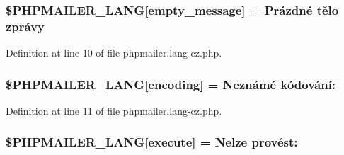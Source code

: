 \subsubsection[{\texorpdfstring{\$\+P\+H\+P\+M\+A\+I\+L\+E\+R\+\_\+\+L\+A\+NG}{$PHPMAILER_LANG}}]{\setlength{\rightskip}{0pt plus 5cm}\$P\+H\+P\+M\+A\+I\+L\+E\+R\+\_\+\+L\+A\+NG\mbox{[}\textquotesingle{}empty\+\_\+message\textquotesingle{}\mbox{]} = \textquotesingle{}Prázdné tělo zprávy\textquotesingle{}}\hypertarget{phpmailer_8lang-cz_8php_a33772099f637c9d6c2cd7425e0e37fed}{}\label{phpmailer_8lang-cz_8php_a33772099f637c9d6c2cd7425e0e37fed}


Definition at line 10 of file phpmailer.\+lang-\/cz.\+php.

\subsubsection[{\texorpdfstring{\$\+P\+H\+P\+M\+A\+I\+L\+E\+R\+\_\+\+L\+A\+NG}{$PHPMAILER_LANG}}]{\setlength{\rightskip}{0pt plus 5cm}\$P\+H\+P\+M\+A\+I\+L\+E\+R\+\_\+\+L\+A\+NG\mbox{[}\textquotesingle{}encoding\textquotesingle{}\mbox{]} = \textquotesingle{}Neznámé kódování\+: \textquotesingle{}}\hypertarget{phpmailer_8lang-cz_8php_a817f7283f3d54c970a0c10305cc668cc}{}\label{phpmailer_8lang-cz_8php_a817f7283f3d54c970a0c10305cc668cc}


Definition at line 11 of file phpmailer.\+lang-\/cz.\+php.

\subsubsection[{\texorpdfstring{\$\+P\+H\+P\+M\+A\+I\+L\+E\+R\+\_\+\+L\+A\+NG}{$PHPMAILER_LANG}}]{\setlength{\rightskip}{0pt plus 5cm}\$P\+H\+P\+M\+A\+I\+L\+E\+R\+\_\+\+L\+A\+NG\mbox{[}\textquotesingle{}execute\textquotesingle{}\mbox{]} = \textquotesingle{}Nelze provést\+: \textquotesingle{}}\hypertarget{phpmailer_8lang-cz_8php_a668217a9563a168f30f2a8548b6ed5a9}{}\label{phpmailer_8lang-cz_8php_a668217a9563a168f30f2a8548b6ed5a9}


